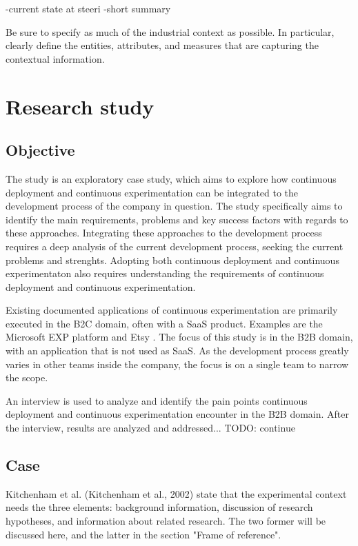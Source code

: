 \documentclass[english]{tktltiki2}
\theoremstyle{definition}
\theoremstyle{remark}
\begin{document}
\cite{olsson2012climbing}

-current state at steeri
    -short summary

Be sure to specify as much of the industrial context as possible. In particular,
clearly deﬁne the entities, attributes, and measures that are capturing the contextual information.

\section{Research study}

\subsection{Objective} %

The study is an exploratory case study, which aims to explore how continuous deployment and continuous experimentation can be integrated to the development process of the company in question. The study specifically aims to identify the main requirements, problems and key success factors with regards to these approaches. Integrating these approaches to the development process requires a deep analysis of the current development process, seeking the current problems and strenghts. Adopting both continuous deployment and continuous experimentaton also requires understanding the requirements of continuous deployment and continuous experimentation. 

Existing documented applications of continuous experimentation are primarily executed in the B2C domain, often with a SaaS product. Examples are the Microsoft EXP platform \cite{ep} and Etsy \cite{}. The focus of this study is in the B2B domain, with an application that is not used as SaaS. As the development process greatly varies in other teams inside the company, the focus is on a single team to narrow the scope.

An interview is used to analyze and identify the pain points continuous deployment and continuous experimentation encounter in the B2B domain. After the interview, results are analyzed and addressed... TODO: continue

\subsection{Case} %
Kitchenham et al. (Kitchenham et al., 2002) state that the experimental context needs the three elements: background information, discussion of research hypotheses, and information about related research. The two former will be discussed here, and the latter in the section "Frame of reference".
\end{document}

